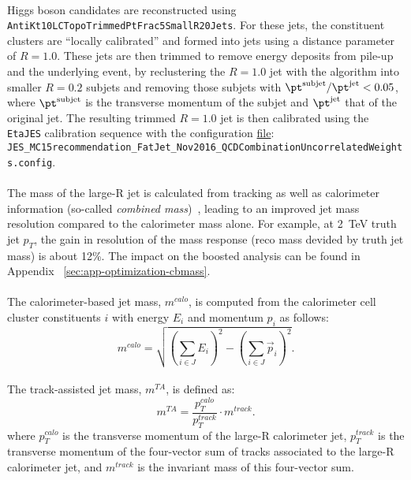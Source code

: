 \paragraph{}
Higgs boson candidates are reconstructed using \\
 \verb|AntiKt10LCTopoTrimmedPtFrac5SmallR20Jets|. 
 For these jets, the constituent clusters are ``locally calibrated'' \cite{Aad:2011he} and formed into jets using a distance parameter of $R=1.0$. These jets are then trimmed \cite{Krohn2010} to remove energy deposits from pile-up and the underlying event, by reclustering the $R=1.0$ jet with the \kt algorithm into smaller $R=0.2$ subjets and removing those subjets with $\pt^{\rm{subjet}}/\pt^{\rm{jet}} < 0.05$, where $\pt^{\rm{subjet}}$ is the transverse momentum of the subjet and $\pt^{\rm{jet}}$ that of the original jet. The resulting trimmed $R=1.0$ jet is then calibrated using the \verb|EtaJES| calibration sequence with the configuration \href{https://twiki.cern.ch/twiki/bin/view/AtlasProtected/ApplyJetCalibration2016}{file}: \\ \verb|JES_MC15recommendation_FatJet_Nov2016_QCDCombinationUncorrelatedWeights.config|.

\paragraph{}
The mass of the large-R jet is calculated from tracking as well as calorimeter information (so-called \emph{combined mass})~\cite{ATLAS-CONF-2016-035}, leading to an improved jet mass resolution compared to the calorimeter mass alone. For example, at 2~TeV truth jet $p_T$, the gain in resolution of the mass response (reco mass devided by truth jet mass) is about 12\%. The impact on the boosted analysis can be found in Appendix ~\ref{sec:app-optimization-cbmass}.

\paragraph{}
The calorimeter-based jet mass, $m^{calo}$, is computed from the calorimeter cell cluster constituents $i$ with energy $E_i$ and momentum $p_i$ as follows:
\begin{equation}
m^{calo} = \sqrt{\left(\sum_{i\in J}E_i\right)^2-\left(\sum_{i\in J}\vec{p}_i\right)^2}.
\end{equation}

\paragraph{}
The track-assisted jet mass, $m^{TA}$, is defined as:
\begin{equation}
m^{TA} = \frac{p_T^{calo}}{p_T^{track}} \cdot m^{track}.
\end{equation}
where $p_{T}^{calo}$ is the transverse momentum of the large-R calorimeter jet, $p_{T}^{track}$ is the transverse momentum of the four-vector sum of tracks associated to the large-R calorimeter jet, and $m^{track}$ is the invariant mass of this four-vector sum.

